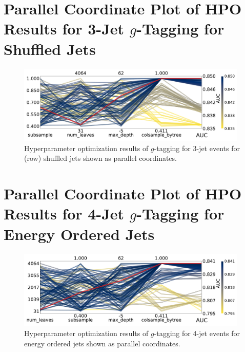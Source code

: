 \section[Parallel Coordinate Plot of HPO Results for 3-Jet g-Tagging for Shuffled Jets]{Parallel Coordinate Plot of HPO Results for 3-Jet $g$-Tagging for Shuffled Jets}
\begin{figure}[h!]
  \includegraphics[width=0.98\textwidth, trim=0 0 0 0, clip]{figures/quarks/CV_viz-njet=3-name=lf_gtag_shuffled_lgb_down_sample=1.00-ML_vars=vertex-selection=b-ejet_min=4-n_iter_RS_lgb=99-n_iter_RS_xgb=9-cdot_cut=0.90-version=19.pdf}
  \caption[Parallel Coordinate Plot of HPO Results for 3-Jet $g$-Tagging for Shuffled Jets]
          {Hyperparameter optimization results of $g$-tagging for 3-jet events for (row) shuffled jets shown as parallel coordinates. 
          } 
  \label{fig:q:CV_res_parallel_coords_g_tag_3j_shuffled}
\end{figure}
\clearpage


\FloatBarrier
\section[Parallel Coordinate Plot of HPO Results for 4-Jet g-Tagging for Energy Ordered Jets]{Parallel Coordinate Plot of HPO Results for 4-Jet $g$-Tagging for Energy Ordered Jets}
\begin{figure}[h!]
  \includegraphics[width=0.98\textwidth, trim=0 0 0 0, clip]{figures/quarks/CV_viz-njet=4-name=lf_gtag_energy_ordered_lgb_down_sample=1.00-ML_vars=vertex-selection=b-ejet_min=4-n_iter_RS_lgb=99-n_iter_RS_xgb=9-cdot_cut=0.90-version=19.pdf}
  \caption[Parallel Coordinate Plot of HPO Results for 4-Jet $g$-Tagging for Energy Ordered Jets]
          {Hyperparameter optimization results of $g$-tagging for 4-jet events for energy ordered jets shown as parallel coordinates. 
          } 
  \label{fig:q:CV_res_parallel_coords_g_tag_4j_energy_ordered}
\end{figure}
\vspace{3cm}
